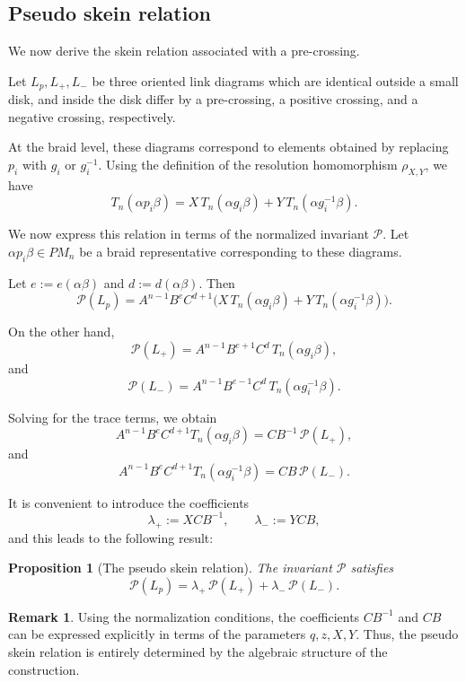 \documentclass[11pt]{article}
\numberwithin{equation}{section}
\newtheorem{proposition}[theorem]{Proposition}
\theoremstyle{definition}
\newtheorem{remark}[theorem]{Remark}
\begin{document}
\subsection{Pseudo skein relation}

We now derive the skein relation associated with a pre-crossing.

\medskip 

Let \(L_p, L_+, L_-\) be three oriented link diagrams which are identical outside a small disk, and inside the disk differ by a pre-crossing, a positive crossing, and a negative crossing, respectively.

At the braid level, these diagrams correspond to elements obtained by replacing \(p_i\) with \(g_i\) or \(g_i^{-1}\). Using the definition of the resolution homomorphism \(\rho_{X,Y}\), we have
\[
T_n(\alpha p_i \beta)
=
X\,T_n(\alpha g_i \beta)
+
Y\,T_n(\alpha g_i^{-1} \beta).
\]

We now express this relation in terms of the normalized invariant
\(\mathcal P\). Let \(\alpha p_i \beta \in PM_n\) be a braid representative corresponding to these diagrams.


Let \(e := e(\alpha\beta)\) and \(d := d(\alpha\beta)\). Then
\[
\mathcal P(L_p)
=
A^{n-1} B^{e} C^{d+1}
\Big(
X\,T_n(\alpha g_i \beta)
+
Y\,T_n(\alpha g_i^{-1} \beta)
\Big).
\]

On the other hand,
\[
\mathcal P(L_+)
=
A^{n-1} B^{e+1} C^{d}
\,T_n(\alpha g_i \beta),
\]
and
\[
\mathcal P(L_-)
=
A^{n-1} B^{e-1} C^{d}
\,T_n(\alpha g_i^{-1} \beta).
\]

Solving for the trace terms, we obtain
\[
A^{n-1} B^{e} C^{d+1} T_n(\alpha g_i \beta)
=
C B^{-1} \,\mathcal P(L_+),
\]
and
\[
A^{n-1} B^{e} C^{d+1} T_n(\alpha g_i^{-1} \beta)
=
C B \,\mathcal P(L_-).
\]

It is convenient to introduce the coefficients
\[
\lambda_+ := X C B^{-1},
\qquad
\lambda_- := Y C B,
\]
and this leads to the following result:

\begin{proposition}[The pseudo skein relation]
The invariant \(\mathcal P\) satisfies
\[
\mathcal P(L_p)
=
\lambda_+ \,\mathcal P(L_+)
+
\lambda_- \,\mathcal P(L_-).
\]
\end{proposition}

\begin{remark}
Using the normalization conditions, the coefficients \(CB^{-1}\) and \(CB\) can be expressed explicitly in terms of the parameters \(q,z,X,Y\). Thus, the pseudo skein relation is entirely determined by the algebraic structure of the construction.
\end{remark}
\end{document}
